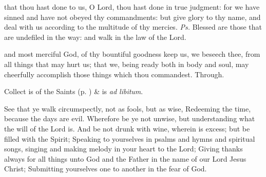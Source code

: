 \properantiphonfix

\introit
{} that thou hast done to us, O Lord, thou hast done in true judgment: for we have sinned and have not obeyed thy commandments: but give glory to thy name, and deal with us according to the multitude of thy mercies. \textit{Ps.} Blessed are those that are undefiled in the way: and walk in the law of the Lord.

\collect
{} and most merciful God, of thy bountiful goodness keep us, we beseech thee, from all things that may hurt us; that we, being ready both in body and soul, may cheerfully accomplish those things which thou commandest. Through.
\begin{rubric}
     Collect is of the Saints (p. \pageref{SPSaints}) \&  is \emph{ad libitum}.
\end{rubric}

 See that ye walk circumspectly, not as fools, but as wise, Redeeming the time, because the days are evil. Wherefore be ye not unwise, but understanding what the will of the Lord is. And be not drunk with wine, wherein is excess; but be filled with the Spirit; Speaking to yourselves in psalms and hymns and spiritual songs, singing and making melody in your heart to the Lord; Giving thanks always for all things unto God and the Father in the name of our Lord Jesus Christ; Submitting yourselves one to another in the fear of God.


